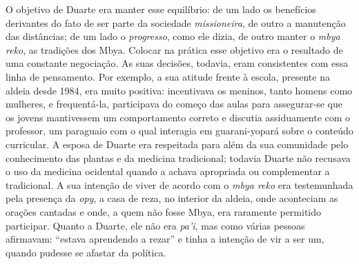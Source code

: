O objetivo de Duarte era manter esse equilíbrio: de um lado os
benefícios derivantes do fato de ser parte da sociedade
\emph{missioneira}, de outro a manutenção das distâncias; de um lado o
\emph{progresso}, como ele dizia, de outro manter o \emph{mbya reko}, as
tradições dos Mbya. Colocar na prática esse objetivo era o resultado de
uma constante negociação. As suas decisões, todavia, eram consistentes
com essa linha de pensamento. Por exemplo, a sua atitude frente à
escola, presente na aldeia desde 1984, era muito positiva: incentivava
os meninos, tanto homens como mulheres, e frequentá-la, participava do
começo das aulas para assegurar-se que os jovens mantivessem um
comportamento correto e discutia assiduamente com o professor, um
paraguaio com o qual interagia em guarani-yopará sobre o conteúdo
curricular. A esposa de Duarte era respeitada para além da sua
comunidade pelo conhecimento das plantas e da medicina tradicional;
todavia Duarte não recusava o uso da medicina ocidental quando a achava
apropriada ou complementar a tradicional. A sua intenção de viver de
acordo com o \emph{mbya reko} era testemunhada pela presença da
\emph{opy}, a casa de reza, no interior da aldeia, onde aconteciam as
orações cantadas e onde, a quem não fosse Mbya, era raramente permitido
participar. Quanto a Duarte, ele não era \emph{pa'i}, mas como várias
pessoas afirmavam: ``estava aprendendo a rezar'' e tinha a intenção de
vir a ser um, quando pudesse se afastar da política.

